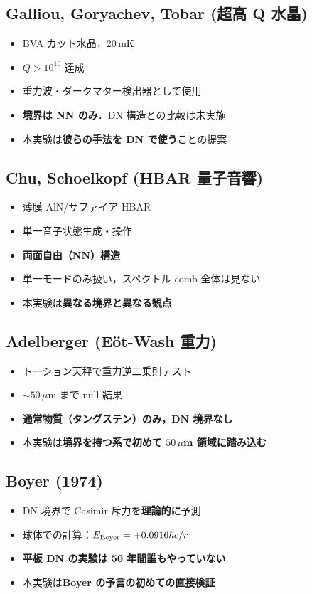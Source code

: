 \documentclass[11pt,a4paper]{article}
\begin{document}
\subsection{Galliou, Goryachev, Tobar (超高 Q 水晶)}

\begin{itemize}
\item BVA カット水晶，20\,mK
\item $Q > 10^{10}$ 達成
\item 重力波・ダークマター検出器として使用
\item \textbf{境界は NN のみ}．DN 構造との比較は未実施
\item 本実験は\textbf{彼らの手法を DN で使う}ことの提案
\end{itemize}

\subsection{Chu, Schoelkopf (HBAR 量子音響)}

\begin{itemize}
\item 薄膜 AlN/サファイア HBAR
\item 単一音子状態生成・操作
\item \textbf{両面自由（NN）構造}
\item 単一モードのみ扱い，スペクトル comb 全体は見ない
\item 本実験は\textbf{異なる境界と異なる観点}
\end{itemize}

\subsection{Adelberger (Eöt-Wash 重力)}

\begin{itemize}
\item トーション天秤で重力逆二乗則テスト
\item $\sim 50\,\mu$m まで null 結果
\item \textbf{通常物質（タングステン）のみ，DN 境界なし}
\item 本実験は\textbf{境界を持つ系で初めて $50\,\mu$m 領域に踏み込む}
\end{itemize}

\subsection{Boyer (1974)}

\begin{itemize}
\item DN 境界で Casimir 斥力を\textbf{理論的に}予測
\item 球体での計算：$E_{\rm Boyer} = +0.0916 \hbar c/r$
\item \textbf{平板 DN の実験は 50 年間誰もやっていない}
\item 本実験は\textbf{Boyer の予言の初めての直接検証}
\end{itemize}
\end{document}
